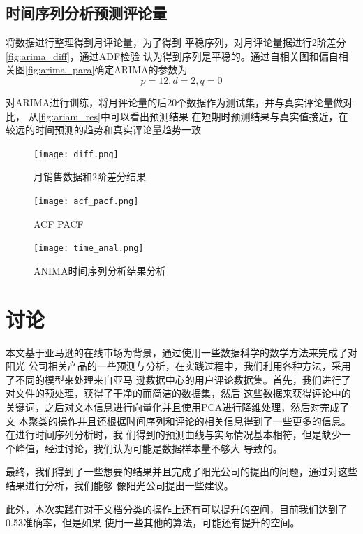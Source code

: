 \section{时间序列分析预测评论量}

将数据进行整理得到月评论量，为了得到
平稳序列，对月评论量据进行2阶差分\autoref{fig:arima_diff}，通过ADF检验
认为得到序列是平稳的。通过自相关图和偏自相关图\autoref{fig:arima_para}确定ARIMA的参数为
\begin{equation}
    p=12,d=2,q=0
\end{equation}

对ARIMA进行训练，将月评论量的后20个数据作为测试集，并与真实评论量做对比， 从\autoref{fig:ariam_res}中可以看出预测结果
在短期时预测结果与真实值接近，在较远的时间预测的趋势和真实评论量趋势一致

\begin{figure}
    \centering
    \texttt{[image: diff.png]}
    \caption{月销售数据和2阶差分结果}
    \label{fig:arima_diff}
\end{figure}

\begin{figure}
    \centering
    \texttt{[image: acf\_pacf.png]}
    \caption{ACF PACF}
    \label{fig:arima_para}
\end{figure}

\begin{figure}
    \centering
    \texttt{[image: time\_anal.png]}
    \caption{ANIMA时间序列分析结果分析}
    \label{fig:arima_res}
\end{figure}
\chapter{讨论}
本文基于亚马逊的在线市场为背景，通过使用一些数据科学的数学方法来完成了对阳光
公司相关产品的一些预测与分析，在实践过程中，我们利用各种方法，采用了不同的模型来处理来自亚马
逊数据中心的用户评论数据集。首先，我们进行了对文件的预处理，获得了干净的而简洁的数据集，然后
这些数据来获得评论中的关键词，之后对文本信息进行向量化并且使用PCA进行降维处理，然后对完成了文
本聚类的操作并且还根据时间序列和评论的相关信息得到了一些更多的信息。在进行时间序列分析时，我
们得到的预测曲线与实际情况基本相符，但是缺少一个峰值，经过讨论，我们认为可能是数据样本量不够大
导致的。

最终，我们得到了一些想要的结果并且完成了阳光公司的提出的问题，通过对这些结果进行分析，我们能够
像阳光公司提出一些建议。

此外，本次实践在对于文档分类的操作上还有可以提升的空间，目前我们达到了0.53准确率，但是如果
使用一些其他的算法，可能还有提升的空间。
